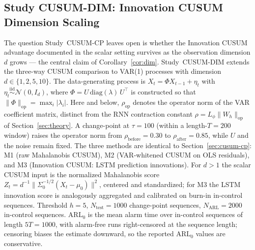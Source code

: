 \documentclass[bj,authoryear]{imsart}
\theoremstyle{plain}
\theoremstyle{definition}
\begin{document}
\subsection{Study CUSUM-DIM: Innovation CUSUM Dimension Scaling}
\label{sec:cusum-dim}

The question Study~CUSUM-CP leaves open is whether the Innovation CUSUM
advantage documented in the scalar setting survives as the observation
dimension $d$ grows --- the central claim of Corollary~\ref{cor:dim}.
Study~CUSUM-DIM extends the three-way CUSUM comparison to VAR(1) processes with
dimension $d \in \{1, 2, 5, 10\}$.
The data-generating process is $X_t=\Phi X_{t-1}+\eta_t$ with
$\eta_t\overset{\text{iid}}{\sim}\mathcal{N}(0,I_d)$,
where $\Phi = U\,\mathrm{diag}(\lambda)\,U^\top$ is constructed so that
$\|\Phi\|_{\mathrm{op}} = \max_i |\lambda_i|$.
Here and below, $\rho_{\mathrm{op}}$ denotes the operator norm of the VAR
coefficient matrix, distinct from the RNN contraction constant
$\rho = L_\phi\|W_h\|_{\mathrm{op}}$ of Section~\ref{sec:theory}.
A change-point at $\tau = 100$ (within a length-$T=200$ window) raises the
operator norm from $\rho_{\mathrm{before}}=0.30$ to
$\rho_{\mathrm{after}}=0.85$, while $U$ and the noise remain fixed.
The three methods are identical to Section~\ref{sec:cusum-cp}:
M1 (raw Mahalanobis CUSUM),
M2 (VAR-whitened CUSUM on OLS residuals), and
M3 (Innovation CUSUM: LSTM prediction innovations).
For $d>1$ the scalar CUSUM input is the normalized Mahalanobis score
$Z_t = d^{-1}\|\Sigma_0^{-1/2}(X_t - \mu_0)\|^2$, centered and standardized;
for M3 the LSTM innovation score is analogously aggregated and calibrated
on burn-in in-control sequences.
Threshold $h=5$, $N_{\mathrm{test}}=1000$ change-point sequences,
$N_{\mathrm{ARL}}=2000$ in-control sequences.
ARL$_0$ is the mean alarm time over in-control sequences of length
$5T=1000$, with alarm-free runs right-censored at the sequence length;
censoring biases the estimate downward, so the reported ARL$_0$ values
are conservative.
\end{document}
